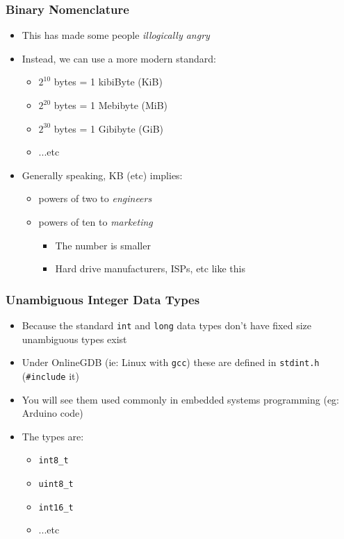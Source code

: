 \documentclass[14pt]{beamer}
\begin{document}
\begin{frame}
\frametitle{Binary Nomenclature}
\begin{itemize}
\item This has made some people \textit{illogically angry}
\item Instead, we can use a more modern standard:
	\begin{itemize}
		\item $2^{10}$ bytes = 1 kibiByte (KiB)
		\item $2^{20}$ bytes = 1 Mebibyte (MiB)
		\item $2^{30}$ bytes = 1 Gibibyte (GiB)
		\item ...etc
	\end{itemize}
\item Generally speaking, KB (etc) implies:
	\begin{itemize}
		\item powers of two to \textit{engineers}
		\item powers of ten to \textit{marketing}
			\begin{itemize}
				\item The number is smaller
				\item Hard drive manufacturers, ISPs, etc like this
			\end{itemize}
	\end{itemize}
\end{itemize}
\end{frame}

\begin{frame}
\frametitle{Unambiguous Integer Data Types}
\begin{itemize}
\item Because the standard \texttt{int} and \texttt{long} data types don't have fixed size unambiguous types exist
\item Under OnlineGDB (ie: Linux with \texttt{gcc}) these are defined in \texttt{stdint.h} (\texttt{\#include} it)
\item You will see them used commonly in embedded systems programming (eg: Arduino code)
\item The types are:
	\begin{itemize}
		\item \texttt{int8\_t}
		\item \texttt{uint8\_t}
		\item \texttt{int16\_t}
		\item ...etc
	\end{itemize}
\end{itemize}
\end{frame}
\end{document}

